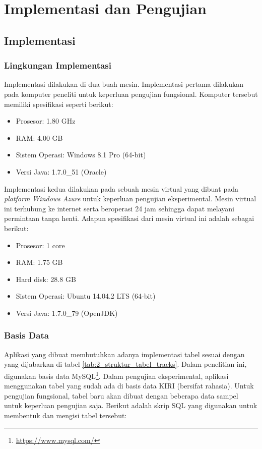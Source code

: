 \chapter{Implementasi dan Pengujian}
\label{chap:implementasi_pengujian}

\section{Implementasi}
\label{chap:implementasi}

\subsection{Lingkungan Implementasi}

Implementasi dilakukan di dua buah mesin. Implementasi pertama dilakukan pada komputer peneliti untuk keperluan pengujian fungsional. Komputer tersebut memiliki spesifikasi seperti berikut:

\begin{itemize}
	\item Prosesor: 1.80 GHz
	\item RAM: 4.00 GB
	\item Sistem Operasi: Windows 8.1 Pro (64-bit)
	\item Versi Java: 1.7.0\_51 (Oracle)
\end{itemize}

Implementasi kedua dilakukan pada sebuah mesin virtual yang dibuat pada \textit{platform Windows Azure} untuk keperluan pengujian eksperimental. Mesin virtual ini terhubung ke internet serta beroperasi 24 jam sehingga dapat melayani permintaan tanpa henti. Adapun spesifikasi dari mesin virtual ini adalah sebagai berikut:

\begin{itemize}
	\item Prosesor: 1 core
	\item RAM: 1.75 GB
	\item Hard disk: 28.8 GB
	\item Sistem Operasi: Ubuntu 14.04.2 LTS (64-bit)
	\item Versi Java: 1.7.0\_79 (OpenJDK)
\end{itemize}

\subsection{Basis Data}

Aplikasi yang dibuat membutuhkan adanya implementasi tabel sesuai dengan yang dijabarkan di tabel \ref{tab:2_struktur_tabel_tracks}. Dalam penelitian ini, digunakan basis data MySQL\footnote{\url{https://www.mysql.com/}}. Dalam pengujian eksperimental, aplikasi menggunakan tabel yang sudah ada di basis data KIRI (bersifat rahasia). Untuk pengujian fungsional, tabel baru akan dibuat dengan beberapa data sampel untuk keperluan pengujian saja. Berikut adalah skrip SQL yang digunakan untuk membentuk dan mengisi tabel tersebut:

